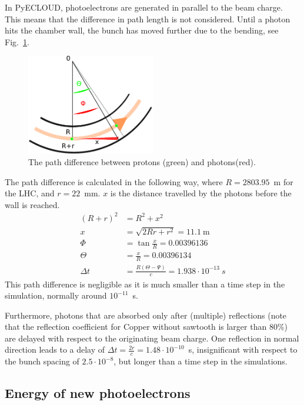 In PyECLOUD, photoelectrons are generated in parallel to the beam charge.
This means that the difference in path length is not considered.
Until a photon hits the chamber wall, the bunch has moved further due to the bending, see Fig.~\ref{fig:drawing}.
\begin{figure}[tbh]
    \centering
    \includegraphics[width=0.5\textwidth]{../scripts/drawing.pdf}
    \caption{The path difference between protons (green) and photons(red).}
    \label{fig:drawing}
\end{figure}
The path difference is calculated in the following way, where $R=2803.95$~m for the LHC, and $r=22$~mm.
$x$ is the distance travelled by the photons before the wall is reached.
\begin{align}
    (R+r)^2 &= R^2 + x^2
    \\
    x &= \sqrt{2Rr + r^2} = 11.1~\text{m}
    \\
    \Phi &= \tan\frac{x}{R} = 0.00396136
    \\
    \Theta &= \frac{x}{R} = 0.00396134
    \\
    \Delta t &= \frac{R(\Theta - \Psi)}{c} = 1.938\cdot10^{-13}~s
\end{align}
This path difference is negligible as it is much smaller than a time step in the simulation, normally around $10^{-11}$~s.

Furthermore, photons that are absorbed only after (multiple) reflections (note that the reflection coefficient for Copper without sawtooth is larger than 80\%) are delayed with respect to the originating beam charge.
One reflection in normal direction leads to a delay of $\Delta t = \frac{2r}{c} = 1.48\cdot10^{-10}$~s, insignificant with respect to the bunch spacing of $2.5\cdot10^{-8}$, but longer than a time step in the simulations.


\subsection{Energy of new photoelectrons}

